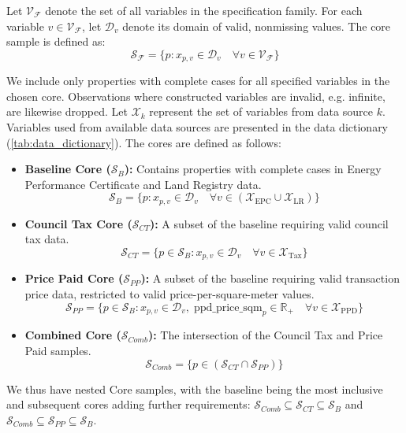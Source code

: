 \documentclass[12pt]{article}
\begin{document}
Let $\mathcal{V_\mathcal{F}}$ denote the set of all variables in the specification family. For each variable $v \in \mathcal{V}_\mathcal{F}$, let $\mathcal{D}_v$ denote its domain of valid, nonmissing values. The core sample is defined as:
\begin{equation*} \label{eq:common_core}
  \mathcal{S}_\mathcal{F} =  \{p: x_{p,v} \in \mathcal{D}_v \quad \forall v \in \mathcal{V}_\mathcal{F}\}
\end{equation*}
 
We include only properties with complete cases for all specified variables in the chosen core.  Observations where constructed variables are invalid, e.g. infinite, are likewise dropped.
Let $\mathcal{X}_{k}$ represent the set of variables from data source $k$. Variables used from available data sources are presented in the data dictionary (\autoref{tab:data_dictionary}). The cores are defined as follows:
\begin{itemize}
    \item \textbf{Baseline Core ($\mathcal{S}_{B}$):} Contains properties with complete cases in Energy Performance Certificate and Land Registry data.
    \[ \mathcal{S}_{B} = \{ p : x_{p,v} \in \mathcal{D}_v \quad \forall v \in (\mathcal{X}_{\text{EPC}} \cup \mathcal{X}_{\text{LR}}) \} \]

    \item \textbf{Council Tax Core ($\mathcal{S}_{CT}$):} A subset of the baseline requiring valid council tax data.
    \[ \mathcal{S}_{CT} = \{ p \in \mathcal{S}_{B} : x_{p,v} \in \mathcal{D}_v \quad \forall v \in \mathcal{X}_{\text{Tax}} \} \]

    \item \textbf{Price Paid Core ($\mathcal{S}_{PP}$):} A subset of the baseline requiring valid transaction price data, restricted to valid price-per-square-meter values.
    \[ \mathcal{S}_{PP} = \{ p \in \mathcal{S}_{B} : x_{p,v} \in \mathcal{D}_v , \; \text{ppd\_price\_sqm}_p \in \mathbb{R}_+  \quad \forall v \in \mathcal{X}_{\text{PPD}} \} \]

    \item \textbf{Combined Core ($\mathcal{S}_{Comb}$):} The intersection of the Council Tax and Price Paid samples.
    \[ \mathcal{S}_{Comb} = \{ p \in (\mathcal{S}_{CT} \cap \mathcal{S}_{PP})\} \]
\end{itemize}
We thus have nested Core samples, with the baseline being the most inclusive and  subsequent cores adding further requirements: $\mathcal{S}_{Comb} \subseteq \mathcal{S}_{CT} \subseteq \mathcal{S}_{B}$ and $\mathcal{S}_{Comb} \subseteq \mathcal{S}_{PP} \subseteq \mathcal{S}_{B}$.
\end{document}
